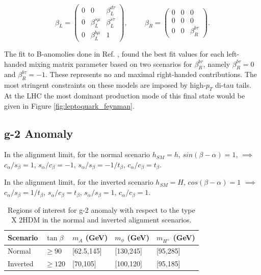 \begin{equation}
\beta_{L} = 
\begin{pmatrix}
0 & 0 & \beta_{L}^{d\tau} \\
0 & \beta_{L}^{s\mu} & \beta_{L}^{s\tau} \\
0 & \beta_{L}^{b\mu} & 1
\end{pmatrix},
\hspace{1cm}
\beta_{R} = 
\begin{pmatrix}
0 & 0 & 0 \\
0 & 0 & 0 \\
0 & 0 & \beta_{R}^{b\tau}
\end{pmatrix}.
\end{equation}

The fit to B-anomolies done in Ref. \cite{leptoquark}, found the best fit values for each left-handed mixing matrix parameter based on two scenarios for $\beta^{b\tau}_{R}$, namely $\beta^{b\tau}_{R} = 0$ and $\beta^{b\tau}_{R} = -1$. These represents no and maximal right-handed contributions. The most stringent constraints on these models are imposed by high-$p_{T}$ di-tau tails. At the LHC the most dominant production mode of this final state would be given in Figure \ref{fig:leptoquark_feynman}.

\subsection{g-2 Anomaly}

In the alignment limit, for the normal scenario $h_{SM}=h$, $sin(\beta-\alpha)=1$, $\implies$ $c_{\alpha}/s_{\beta}=1$, $s_{\alpha}/c_{\beta}=-1$, $s_{\alpha}/s_{\beta}=-1/t_{\beta}$, $c_{\alpha}/c_{\beta}=t_{\beta}$.

In the alignment limit, for the inverted scenario $h_{SM}=H$, $cos(\beta-\alpha)=1$ $\implies$ $c_{\alpha}/s_{\beta}=1/t_{\beta}$, $s_{\alpha}/c_{\beta}=t_{\beta}$, $s_{\alpha}/s_{\beta}=1$, $c_{\alpha}/c_{\beta}=1$.


\begin{table}[H]
    \centering
    \begin{tabular}{|p{1.5cm}|x{2.2cm}x{2.2cm}x{2.2cm}x{2.2cm}|}
         \hline
         Scenario & $\tan\beta$ & $m_{A}$ (GeV) & $m_{\phi}$ (GeV) & $m_{H^{\pm}}$ (GeV) \\
         \hline
         \hline
         Normal & $\geq 90$ & [62.5,145] & [130,245] & [95,285] \\
         Inverted & $\geq 120$ & [70,105] & [100,120] & [95,185] \\
         \hline
    \end{tabular}
    \caption{Regions of interest for g-2 anomaly with respect to the type X 2HDM in the normal and inverted alignment scenarios.}
    \label{tab:gm2region}
\end{table}